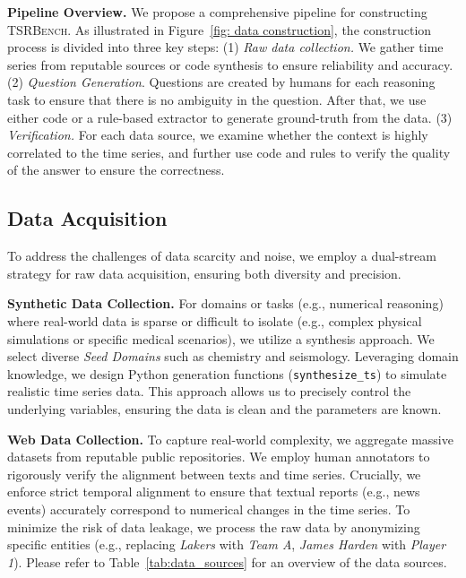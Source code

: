 \documentclass{article}
\theoremstyle{plain}
\theoremstyle{definition}
\theoremstyle{remark}
\newcommand\ours{\textsc{TSRBench}\xspace}
\theoremstyle{plain}
\begin{document}
\textbf{Pipeline Overview.} We propose a comprehensive pipeline for constructing \ours. As illustrated in Figure~\ref{fig: data construction}, the construction process is divided into three key steps: (1) \textit{Raw data collection.} We gather time series from reputable sources or code synthesis to ensure reliability and accuracy. (2) \textit{Question Generation}. Questions are created by humans for each reasoning task to ensure that there is no ambiguity in the question. After that, we use either code or a rule-based extractor to generate ground-truth from the data. (3) \textit{Verification.} For each data source, we examine whether the context is highly correlated to the time series, and further use code and rules to verify the quality of the answer to ensure the correctness.

\subsection{Data Acquisition}
To address the challenges of data scarcity and noise, we employ a dual-stream strategy for raw data acquisition, ensuring both diversity and precision.

\textbf{Synthetic Data Collection.}
For domains or tasks (e.g., numerical reasoning) where real-world data is sparse or difficult to isolate (e.g., complex physical simulations or specific medical scenarios), we utilize a synthesis approach. We select diverse \textit{Seed Domains} such as chemistry and seismology. Leveraging domain knowledge, we design Python generation functions (\texttt{synthesize\_ts}) to simulate realistic time series data. This approach allows us to precisely control the underlying variables, ensuring the data is clean and the parameters are known.

\textbf{Web Data Collection.}
To capture real-world complexity, we aggregate massive datasets from reputable public repositories. We employ human annotators to rigorously verify the alignment between texts and time series. Crucially, we enforce strict temporal alignment to ensure that textual reports (e.g., news events) accurately correspond to numerical changes in the time series. To minimize the risk of data leakage, we process the raw data by anonymizing specific entities (e.g., replacing \textit{Lakers} with \textit{Team A}, \textit{James Harden} with \textit{Player 1}). 
Please refer to Table~\ref{tab:data_sources} for an overview of the data sources.
\end{document}
